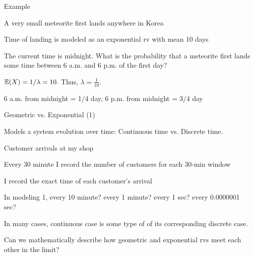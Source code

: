 \begin{frame}{Example}

\plitemsep 0.07in
\bci
\item A very small meteorite first lands anywhere in Korea \hspace{4.5cm} 

\item<2-> Time of landing is modeled as an exponential rv with mean 10 days

\item<3-> The current time is midnight. What is the probability that a meteorite first lands some time between 6 a.m. and 6 p.m. of the first day? \hfill {}

\item<4-> 
\bci
\item<4-> $\mathbb{E}( X ) = 1/\lambda = 10.$ Thus, $\lambda = \frac{1}{10}.$
\item<5-> 6 a.m. from midnight = 1/4 day, 6 p.m. from midnight = 3/4 day

\eci
\eci

\end{frame}

\begin{frame}{Geometric vs. Exponential (1)}

\plitemsep 0.05in
\bci

\item<1-> Models a system evolution over time: Continuous time vs. Discrete time.
\bci
\item<2-> \exam Customer arrivals at my shop
\item<2->  Every 30 minute I record the number of customers for each 30-min window
\item<2->  I record the exact time of each customer's arrival
\item<3-> In modeling 1, every 10 minute? every 1 minute? every 1 sec? every 0.0000001 sec?
\eci

\item<4-> In many cases, continuous case is some type of  of its corresponding discrete case.


\item<5-> Can we mathematically describe how geometric and exponential rvs meet each other in the limit?

\eci
\end{frame}

